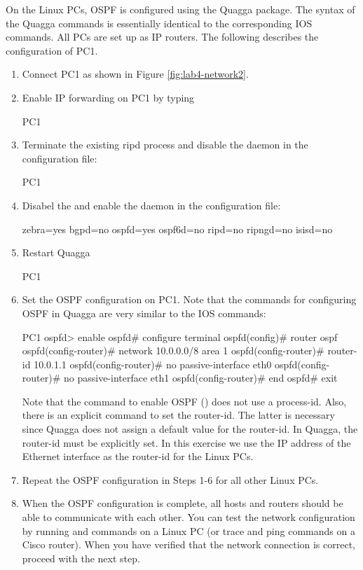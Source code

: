 On the Linux PCs, OSPF is configured using the Quagga package. The syntax of the Quagga commands is essentially identical to the corresponding IOS commands. All PCs are set up as IP routers. The following describes the configuration of PC1.
\begin{enumerate}
	\item Connect PC1 as shown in Figure \ref{fig:lab4-network2}.
	\item Enable IP forwarding on PC1 by typing
		\begin{cmdblock}
	PC1%
		\end{cmdblock}
	\item Terminate the existing ripd process and disable the  daemon in the  configuration file: 
		\begin{cmdblock}
	PC1%
		\end{cmdblock}
	\item Disabel the  and enable the  daemon in the  configuration file: 
		\begin{cmdblock}
	zebra=yes
	bgpd=no
	ospfd=yes
	ospf6d=no
	ripd=no
	ripngd=no
	isisd=no
		\end{cmdblock}
	\item Restart Quagga
		\begin{cmdblock}
	PC1%
		\end{cmdblock}
	\item Set the OSPF configuration on PC1. Note that the commands for configuring OSPF in Quagga are very similar to the IOS commands:
		\begin{cmdblock}
	PC1%
	ospfd> enable
	ospfd# configure terminal
	ospfd(config)# router ospf 
	ospfd(config-router)# network 10.0.0.0/8 area 1 
	ospfd(config-router)# router-id 10.0.1.1 
	ospfd(config-router)# no passive-interface eth0 
	ospfd(config-router)# no passive-interface eth1
	ospfd(config-router)# end
	ospfd# exit
		\end{cmdblock}
		Note that the command to enable OSPF () does not use a process-id. Also, there is an explicit command to set the router-id. The latter is necessary since Quagga does not assign a default value for the router-id. In Quagga, the router-id must be explicitly set. In this exercise we use the IP address of the Ethernet interface  as the router-id for the Linux PCs.
	\item Repeat the OSPF configuration in Steps 1-6 for all other Linux PCs.
	\item When the OSPF configuration is complete, all hosts and routers should be able to communicate with each other. You can test the network configuration by running  and  commands on a Linux PC (or trace and ping commands on a Cisco router). When you have verified that the network connection is correct, proceed with the next step.
\end{enumerate}

